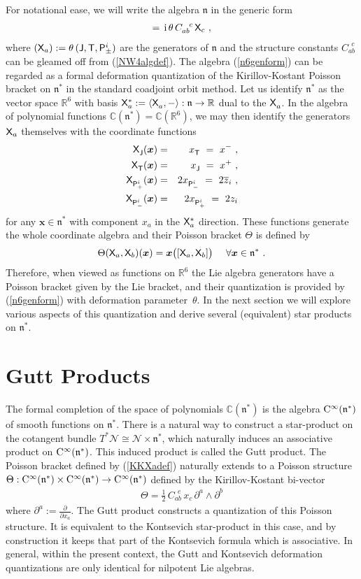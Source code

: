 \documentclass[11pt,a4paper]{article}
\newcommand{\mbf}[1]{{\boldsymbol {#1} }}
\def\ii{{\,{\rm i}\,}}
\def\CC{{\rm C}}
\def\P{{\sf P}}
\def\T{{\sf T}}
\def\X{{\sf X}}
\def\J{{\sf J}}
\def\mx{{\mbf x}}
\def\mfn{{\mathfrak n}}
\newcommand{\newsection}{\setcounter{equation}{0}\section}
\newcommand{\complex}{{\mathbb C}} %
\newcommand{\real}{{\mathbb R}} %
\def\nn{\nonumber}
\def\bea{\begin{eqnarray}}
\def\eea{\end{eqnarray}}
\newcommand{\beq}{\begin{eqnarray}}
\newcommand{\eeq}{\end{eqnarray}}
\begin{document}
For notational ease, we will write the algebra $\mathfrak{n}$ in the
generic form
\beq
[\X_a,\X_b]=\ii\theta\,C_{ab}^{~~c}\,\X_c \ ,
\label{n6genform}\eeq
where $(\X_a):=\theta\,(\J,\T,\P^i_\pm)$ are the
generators of $\mathfrak{n}$ and the structure constants
$C_{ab}^{~~c}$ can be gleamed off from (\ref{NW4algdef}). The algebra
(\ref{n6genform}) can be regarded
as a formal deformation quantization of the Kirillov-Kostant Poisson bracket on
$\mathfrak{n}^*$ in the standard coadjoint orbit method. Let us
identify $\mathfrak{n}^*$ as the vector space $\real^6$ with basis
$\X_a^*:=\langle\X^{~}_a,-\rangle:\mfn\to\real$ dual to the
$\X_a^{~}$. In the algebra of polynomial functions
$\complex(\mathfrak{n}^*)=\complex(\real^6)$, we may then identify
the generators $\X_a$ themselves with the coordinate functions
\bea
\X^{~}_\J(\mx)&=&x^{~}_\T~=~x^- \ , \nn\\ \X^{~}_\T(\mx)
&=&x^{~}_\J~=~x^+ \ , \nn\\ 
\X^{~}_{\P_+^i}(\mx)&=&2x^{~}_{\P_-^i}~=~2\overline{z}_i \ ,
\nn\\ \X^{~}_{\P_-^i}(\mx)&=&2x^{~}_{\P_+^i}~=~2z_i
\label{Xacoordfns}\eea
for any $\mx\in\mathfrak{n}^*$ with component $x_a$ in the $\X_a^*$
direction. These functions generate the whole coordinate algebra and
their Poisson bracket $\Theta$ is defined by
\beq
\Theta(\X_a,\X_b)(\mx)=\mx\bigl([\X_a,\X_b]\bigr) ~~~~ \forall\mx\in
\mathfrak{n}^* \ .
\label{KKXadef}\eeq
Therefore, when viewed as functions on $\real^6$ the Lie algebra
generators have a Poisson bracket given by the Lie bracket, and their
quantization is provided by (\ref{n6genform}) with deformation
parameter~$\theta$. In the next section
we will explore various aspects of this quantization and derive
several (equivalent) star products on $\mfn^*$.

\newsection{Gutt Products\label{StarProds}}

The formal completion of the space of polynomials $\complex(\mfn^*)$ is the
algebra ${\rm C}^\infty(\mathfrak{n}^*)$ of smooth functions on
$\mathfrak{n}^*$. There is a natural way to construct a star-product
  on the cotangent bundle
  $T^*\mathcal{N}\cong\mathcal{N}\times\mathfrak{n}^*$, which
  naturally induces
  an associative product on ${\rm C}^\infty(\mfn^*)$. This induced
  product is called the Gutt product. The Poisson bracket defined by
  (\ref{KKXadef}) naturally extends to a Poisson structure
  $\Theta:\CC^\infty(\mfn^*)\times\CC^\infty(\mfn^*)\to\CC^\infty(\mfn^*)$
  defined by the Kirillov-Kostant bi-vector
\beq
\Theta=\mbox{$\frac12$}\,C_{ab}^{~~c}\,x_c\,\partial^a\wedge\partial^b
\label{KKbivector}\eeq
where $\partial^a:=\frac{\partial}{\partial x_a}$. The Gutt product constructs a
  quantization of this Poisson structure. It is equivalent to the
  Kontsevich star-product in this case, and by construction it keeps
  that part of the Kontsevich formula which is associative. In
  general, within the present context, the Gutt and Kontsevich
  deformation quantizations are only identical for nilpotent Lie
  algebras.
\end{document}
